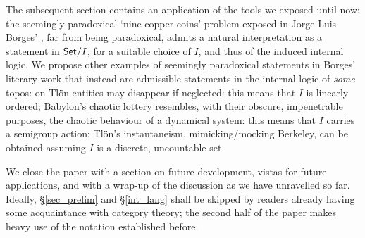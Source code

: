 The subsequent section contains an application of the tools we exposed until now: the seemingly paradoxical `nine copper coins' problem exposed in Jorge Luis Borges' \cite{Borges1963}, far from being paradoxical, admits a natural interpretation as a statement in $\mathsf{Set}/I$, for a suitable choice of $I$, and thus of the induced internal logic. We propose other examples of seemingly paradoxical statements in Borges' literary work that instead are admissible statements in the internal logic of \emph{some} topos: on Tl\"on entities may disappear if neglected: this means that $I$ is linearly ordered; Babylon's chaotic lottery resembles, with their obscure, impenetrable purposes, the chaotic behaviour of a dynamical system: this means that $I$ carries a semigroup action; Tl\"on's instantaneism, mimicking/mocking Berkeley, can be obtained assuming $I$ is a discrete, uncountable set.

We close the paper with a section on future development, vistas for future applications, and with a wrap-up of the discussion as we have unravelled so far. Ideally, §\ref{sec_prelim} and §\ref{int_lang} shall be skipped by readers already having some acquaintance with category theory; the second half of the paper makes heavy use of the notation established before.